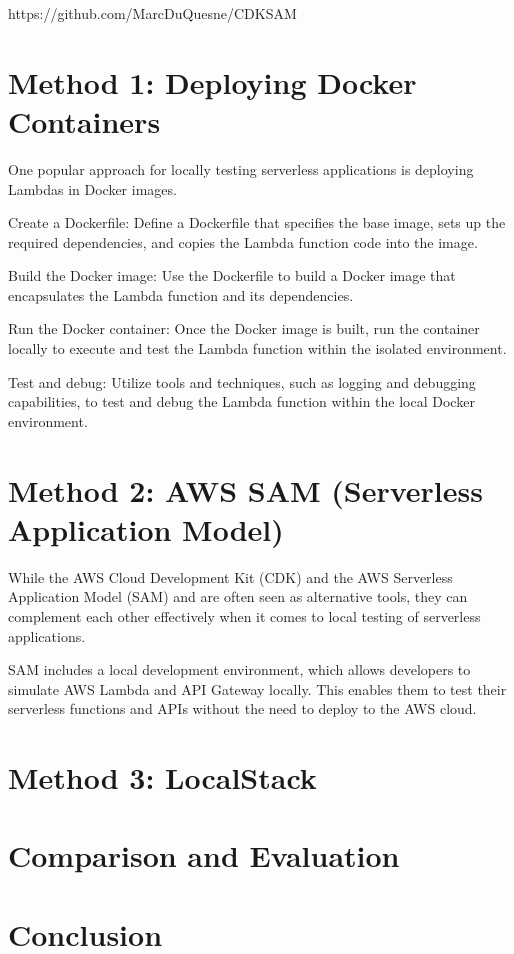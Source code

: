 \documentclass{article}
\begin{document}
https://github.com/MarcDuQuesne/CDKSAM

\section{Method 1: Deploying Docker Containers}

One popular approach for locally testing serverless applications is deploying Lambdas in Docker images.

Create a Dockerfile: Define a Dockerfile that specifies the base image, sets up the required dependencies, and copies the Lambda function code into the image.

Build the Docker image: Use the Dockerfile to build a Docker image that encapsulates the Lambda function and its dependencies.

Run the Docker container: Once the Docker image is built, run the container locally to execute and test the Lambda function within the isolated environment.

Test and debug: Utilize tools and techniques, such as logging and debugging capabilities, to test and debug the Lambda function within the local Docker environment.


\section{Method 2: AWS SAM (Serverless Application Model)}

While the AWS Cloud Development Kit (CDK) and the AWS Serverless Application Model (SAM) and  are often seen as alternative tools, they can complement each other effectively when it comes to local testing of serverless applications.

SAM includes a local development environment, which allows developers to simulate AWS Lambda and API Gateway locally. This enables them to test their serverless functions and APIs without the need to deploy to the AWS cloud.


\section{Method 3: LocalStack}

\section{Comparison and Evaluation}

\section{Conclusion}
\end{document}
